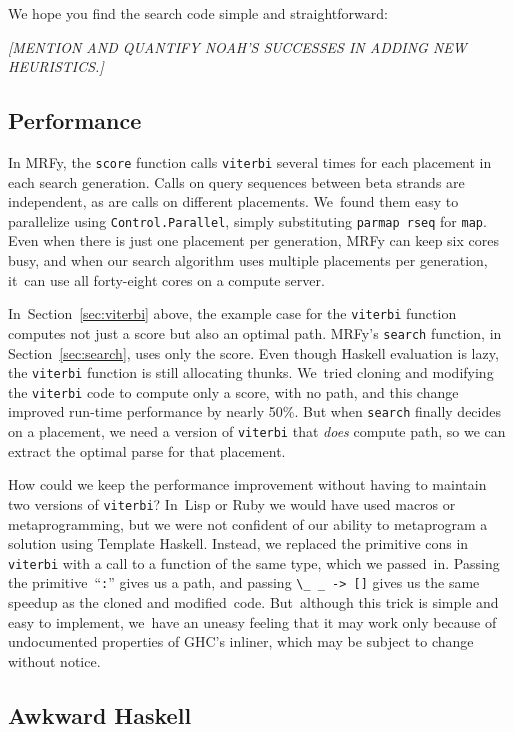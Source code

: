 \documentclass[preprint,nonatbib,blockstyle,nocopyrightspace,times]{sigplanconf}
\newcommand\secref[1]{Section~\ref{sec:#1}}
\newcommand\seclabel[1]{\label{sec:#1}}
\newcommand\smallfuzzverbatiminput[2]{{\par\unskip\small\hfuzz=#1 }}
\begin{document}
\seclabel{search}

We hope you find the search code simple and straightforward:
\smallfuzzverbatiminput{11pt}{search}
\emph{[MENTION AND QUANTIFY NOAH'S SUCCESSES IN ADDING NEW HEURISTICS.]}


\subsection{Performance}


In MRFy, the \texttt{score} function calls \texttt{viterbi} several
 times
for each placement in each search generation.
Calls on query sequences between beta strands are independent,
as are calls on different placements.
We~found them easy to parallelize
using
\texttt{Control.Parallel},
simply substituting
\texttt{parmap rseq} for \texttt{map}.
Even when there is just one placement per generation,
MRFy can keep six cores busy,
and when our search algorithm uses multiple placements per generation,
it~can use all forty-eight cores on a compute server.


In~\secref{viterbi} above, the example case for the \texttt{viterbi}
function computes not just a score but also an optimal path.
MRFy's \texttt{search} function, in \secref{search}, uses only the
score.
Even though Haskell evaluation is lazy, the \texttt{viterbi} function
is still allocating thunks.
We~tried cloning and modifying the \texttt{viterbi} code to compute
only a score, with no path, and this change improved 
run-time performance by nearly 50\%.
But when \texttt{search} finally decides on a placement, we need a
version of \texttt{viterbi} that \emph{does} compute path, so we can
extract the optimal parse for that placement.

How could we keep the performance improvement without having to
maintain two versions of \texttt{viterbi}?
In~Lisp or Ruby we would have used macros or metaprogramming,
but we were not confident of our ability to metaprogram a solution
using Template Haskell.
Instead, we replaced the primitive cons in \texttt{viterbi} with a
call to a function of the same type, which we passed~in.
Passing the primitive~``\texttt{:}'' gives us a path,
and passing \verb+\_ _ -> []+ gives us the same
speedup as the cloned and modified~code.
But~although
this trick is simple and easy to implement, 
we~have an uneasy feeling that it may work only because of undocumented
properties of GHC's inliner, which may be subject to change without
notice. 

\subsection{Awkward Haskell}
\end{document}
